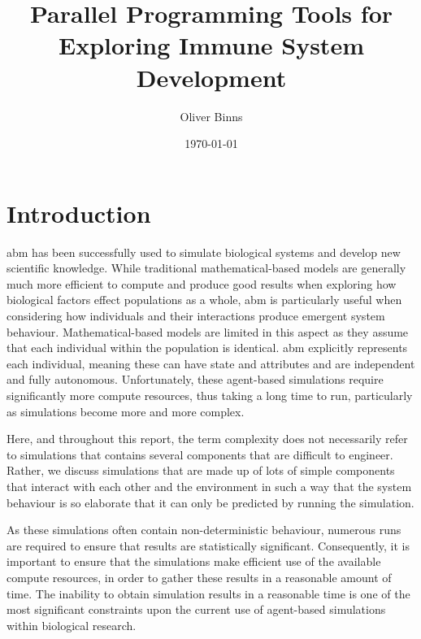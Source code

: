 \documentclass{UoYCSproject}
\title{Parallel Programming Tools for Exploring Immune System Development}
\author{Oliver Binns}
\date{\today}
\begin{document}
\maketitle
\listoffigures
\listoftables
\printglossary[type=\acronymtype]
\printglossary


\chapter{Introduction}
\gls{abm} has been successfully used to simulate biological systems and develop new scientific knowledge\cite{kieran_thesis, flame_keratinocyte}.
While traditional mathematical-based models are generally much more efficient to compute and produce good results when exploring how biological factors effect populations as a whole, \gls{abm} is particularly useful when considering how individuals and their interactions produce emergent system behaviour.
Mathematical-based models are limited in this aspect as they assume that each individual within the population is identical.
\gls{abm} explicitly represents each individual, meaning these can have state and attributes and are independent and fully autonomous.
Unfortunately, these agent-based simulations require significantly more compute resources, thus taking a long time to run, particularly as simulations become more and more complex.

Here, and throughout this report, the term complexity does not necessarily refer to simulations that contains several components that are difficult to engineer.
Rather, we discuss simulations that are made up of lots of simple components that interact with each other and the environment in such a way that the system behaviour is so elaborate that it can only be predicted by running the simulation.

As these simulations often contain non-deterministic behaviour, numerous runs are required to ensure that results are statistically significant.
Consequently, it is important to ensure that the simulations make efficient use of the available compute resources, in order to gather these results in a reasonable amount of time.
The inability to obtain simulation results in a reasonable time is one of the most significant constraints upon the current use of agent-based simulations within biological research.
\end{document}
